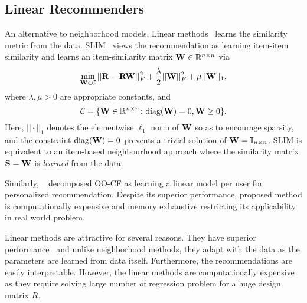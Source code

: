 \subsection{Linear Recommenders}

An alternative to neighborhood models, Linear methods~\cite{Ning:2011, Sedhain:2016} learns the similarity metric from the data. SLIM~\citep{Ning:2011} views the recommendation as learning item-item similarity and learns an item-similarity matrix $\mathbf{W} \in \mathbb{R}^{n \times n}$ via
\begin{equation}
\label{eqn:slim}
\min_{ \mathbf{W} \in \mathcal{C} } || \mathbf{R} - \mathbf{R} \mathbf{W} ||_F^2 + \frac{\lambda}{2} || \mathbf{W} ||_F^2 + \mu || \mathbf{W} ||_1,
\end{equation}
where $\lambda, \mu > 0$ are appropriate constants, and
\begin{equation}
\label{eqn:slim-constraint}
\mathcal{C} = \{ \mathbf{W} \in \mathbb{R}^{n \times n} \colon \text{diag}( \mathbf{W} ) = 0, \mathbf{W} \geq 0 \}.
\end{equation}
Here, $|| \cdot ||_1$ denotes the elementwise $\ell_1$ norm of $\mathbf{W}$ so as to encourage sparsity, and the constraint $\text{diag}( \mathbf{W} ) = 0$ prevents a trivial solution of $\mathbf{W} = \mathbf{I}_{n \times n}$. SLIM is equivalent to an item-based neighbourhood approach where the similarity matrix $\mathbf{S} = \mathbf{W}$ is \emph{learned} from the data.

Similarly, ~\citep{Sedhain:2016} decomposed OO-CF as learning a linear model per user for personalized recommendation. Despite its superior performance, proposed method is computationally expensive and memory exhaustive restricting its applicability in real world problem.

Linear methods are attractive for several reasons. They have superior performance~\cite{Ning:2011, Sedhain:2016} and unlike neighborhood methods, they adapt with the data as the parameters are learned from data itself. Furthermore, the recommendations are easily interpretable. However, the linear methods are computationally expensive as they require solving large number of regression problem for a huge design matrix $R$.

